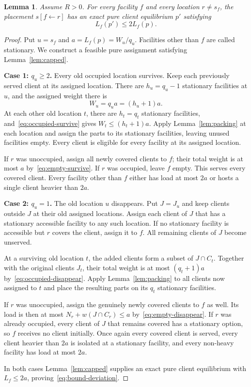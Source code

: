 \documentclass[11pt]{amsart}
\newtheorem{lemma}[theorem]{Lemma}
\theoremstyle{definition}
\begin{document}
\begin{lemma}\label{lem:deviation}
Assume $R>0$. For every facility $f$ and every location $r\ne s_f$, the placement $s[f\leftarrow r]$ has an exact pure client equilibrium $p'$ satisfying
\begin{equation}\label{eq:bound-deviation}
 L_f(p')\le2L_f(p).
\end{equation}
\end{lemma}
\begin{proof}
Put $u=s_f$ and $a=L_f(p)=W_u/q_u$. Facilities other than $f$ are called stationary. We construct a feasible pure assignment satisfying Lemma~\ref{lem:capped}.

\textbf{Case 1: $q_u\ge2$.}
Every old occupied location survives. Keep each previously served client at its assigned location. There are $h_u=q_u-1$ stationary facilities at $u$, and the assigned weight there is
\[
 W_u=q_ua=(h_u+1)a.
\]
At each other old location $t$, there are $h_t=q_t$ stationary facilities, and~\eqref{eq:occupied-survive} gives $W_t\le(h_t+1)a$. Apply Lemma~\ref{lem:packing} at each location and assign the parts to its stationary facilities, leaving unused facilities empty. Every client is eligible for every facility at its assigned location.

If $r$ was unoccupied, assign all newly covered clients to $f$; their total weight is at most $a$ by~\eqref{eq:empty-survive}. If $r$ was occupied, leave $f$ empty. This serves every covered client. Every facility other than $f$ either has load at most $2a$ or hosts a single client heavier than $2a$.

\textbf{Case 2: $q_u=1$.}
The old location $u$ disappears. Put $J=J_u$ and keep clients outside $J$ at their old assigned locations. Assign each client of $J$ that has a stationary accessible facility to any such location. If no stationary facility is accessible but $r$ covers the client, assign it to $f$. All remaining clients of $J$ become unserved.

At a surviving old location $t$, the added clients form a subset of $J\cap C_t$. Together with the original clients $J_t$, their total weight is at most $(q_t+1)a$ by~\eqref{eq:occupied-disappear}. Apply Lemma~\ref{lem:packing} to all clients now assigned to $t$ and place the resulting parts on its $q_t$ stationary facilities.

If $r$ was unoccupied, assign the genuinely newly covered clients to $f$ as well. Its load is then at most $N_r+w(J\cap C_r)\le a$ by~\eqref{eq:empty-disappear}. If $r$ was already occupied, every client of $J$ that remains covered has a stationary option, so $f$ receives no client initially. Once again every covered client is served, every client heavier than $2a$ is isolated at a stationary facility, and every non-heavy facility has load at most $2a$.

In both cases Lemma~\ref{lem:capped} supplies an exact pure client equilibrium with $L_f\le2a$, proving~\eqref{eq:bound-deviation}.
\end{proof}
\end{document}
